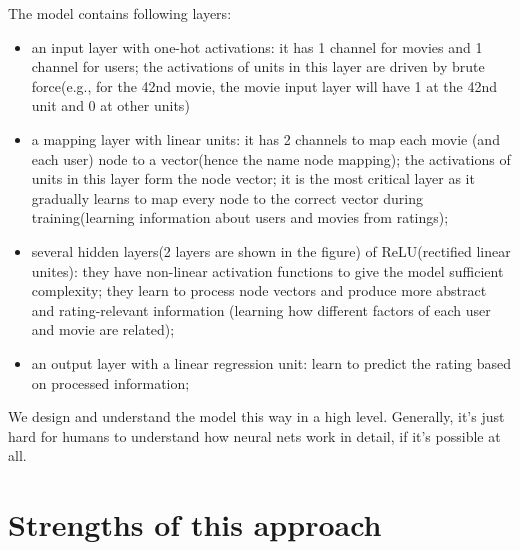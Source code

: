 \documentclass{article}
\begin{document}
The model contains following layers:
\begin{itemize}
	\item an input layer with one-hot activations: it has 1 channel for movies 
	and 1 channel for users;
	the activations of units in this layer are driven by brute force(e.g., for 
	the 42nd movie, the movie input layer will have 1 at the 42nd unit and 0 at 
	other units)
	\item a mapping layer with linear units: it has 2 channels to map each 
	movie (and each user) node to a vector(hence the name node mapping);
	the activations of units in this layer form the node vector;
	it is the most critical layer as it gradually learns to map every node to 
	the correct vector during training(learning information about users and 
	movies from ratings);
	\item several hidden layers(2 layers are shown in the figure) of 
	ReLU(rectified linear unites):
	they have non-linear activation functions to give the model sufficient 
	complexity; 
	they learn to process node vectors and produce more abstract and 
	rating-relevant information (learning how different factors of each user 
	and movie are related);
	\item an output layer with a linear regression unit: learn to predict the 
	rating based on processed information;
\end{itemize}
We design and understand the model this way in a high level.
Generally, it's just hard for humans to understand how neural nets work in 
detail, if it's possible at all.

\section{Strengths of this approach}
\end{document}
